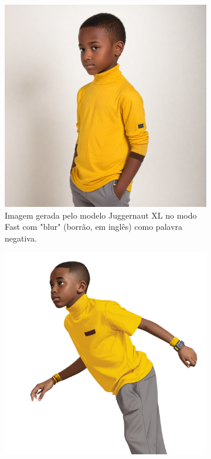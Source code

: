 \begin{figure}[htbp]
\begin{subfigure}{0.35\linewidth}
        \label{fig:cgDream8b}
    \end{subfigure}
    \begin{subfigure}{0.35\linewidth}
        \centering
        \includegraphics[width=1\linewidth]{figs/cgDream/res_char_jug_estilo1a.png}
        \caption{\small Imagem gerada pelo modelo Juggernaut XL no modo Fast com "blur" (borrão, em inglês) como palavra negativa.}
        \label{fig:cgDream8c}
    \end{subfigure}
    \begin{subfigure}{0.35\linewidth}
        \centering
        \includegraphics[width=1\linewidth]{figs/cgDream/res_char_jug_estilo1b.png}

\end{subfigure}
\end{figure}
